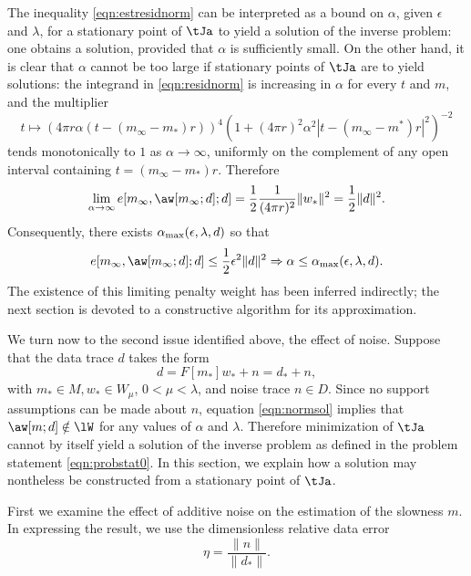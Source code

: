The inequality \ref{eqn:estresidnorm} can be interpreted as a bound 
on $\alpha$, given $\epsilon$ and $\lambda$, for a
stationary point of $\tJa$ to yield a solution of the inverse
problem: one obtains a solution, provided that $\alpha$ is
sufficiently small. On the other hand, it is clear that $\alpha$
cannot be too large if stationary points of $\tJa$ are to yield
solutions: the integrand in \ref{eqn:residnorm} is increasing in
$\alpha$ for every $t$ and $m$, and the multiplier
\[
t \mapsto (4\pi r \alpha(t-(m_{\infty}-m_*)r))^4(1+(4\pi r)^2 \alpha^2 
|t-(m_{\infty}-m^*)r|^2)^{-2}
\]
tends monotonically to $1$ as $\alpha \rightarrow \infty$, uniformly
on the complement of any open interval containing
$t=(m_{\infty}-m_*)r$. Therefore
\begin{equation}
  \label{eqn:elimit}
  \lim_{\alpha \rightarrow \infty}e[m_{\infty},\aw[m_{\infty};d];d] =
  \frac{1}{2}\frac{1}{(4 \pi r)^2}\|w_*\|^2 = \frac{1}{2}\|d\|^2.
\end{equation}
Consequently, there exists $\alpha_{\rm max}(\epsilon,\lambda,d)$ so
that
\[
  e[m_{\infty},\aw[m_{\infty};d];d]  \le \frac{1}{2}\epsilon^2\|d\|^2
  \Rightarrow \alpha \le \alpha_{\rm max}(\epsilon,\lambda,d).
\]
The existence of this limiting penalty weight has been inferred
indirectly; the next section is devoted to a constructive algorithm
for its approximation.

We turn now to the second issue identified above, the effect of
noise. Suppose that the data trace $d$ takes the form
\begin{equation}
  \label{eqn:defdatanoisy}
  d = F[m_*]w_* + n = d_*+n,
\end{equation}
with $m_* \in M, w_* \in W_{\mu}$, $0<\mu<\lambda$, and noise trace $n \in
D$. Since no support assumptions can be made about $n$, equation
\ref{eqn:normsol} implies that $\aw[m;d] \notin \lW$ for any values of
$\alpha$ and $\lambda$.  Therefore minimization of $\tJa$ cannot by itself yield a
solution of the inverse problem as defined in the problem statement
\ref{eqn:probstat0}. In this section, we explain how a solution may
nontheless be constructed from a stationary point of $\tJa$.

First we examine the effect of additive noise on the estimation of the
slowness $m$. In expressing the result, we use the dimensionless
relative data error
\begin{equation}
  \label{eqn:defeta}
  \eta = \frac{\|n\|}{\|d_*\|}. 
\end{equation}

